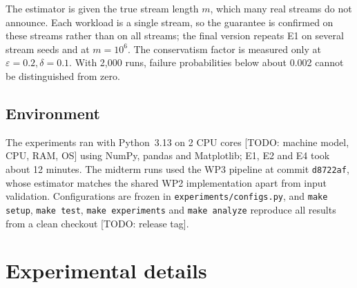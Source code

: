 \documentclass[11pt]{article}
\newcommand{\eps}{\varepsilon}
\begin{document}
The estimator is given the true stream length $m$, which many real streams do
not announce. Each workload is a single stream, so the guarantee is confirmed
on these streams rather than on all streams; the final version repeats E1 on
several stream seeds and at $m = 10^6$. The conservatism factor is measured
only at $\eps = 0.2, \delta = 0.1$. With 2,000 runs, failure probabilities
below about 0.002 cannot be distinguished from zero.

\subsection{Environment}\label{sec:environment}

The experiments ran with Python~3.13 on 2 CPU cores [TODO: machine model, CPU,
RAM, OS] using NumPy, pandas and Matplotlib; E1, E2 and E4 took about 12
minutes. The midterm runs used the WP3 pipeline at commit \texttt{d8722af},
whose estimator matches the shared WP2 implementation apart from input
validation. Configurations are frozen in \texttt{experiments/configs.py}, and
\texttt{make setup}, \texttt{make test}, \texttt{make experiments} and
\texttt{make analyze} reproduce all results from a clean checkout [TODO:
release tag].

\clearpage
\appendix
\setcounter{section}{1}
\section{Experimental details}\label{app:experimental-details}
\end{document}
